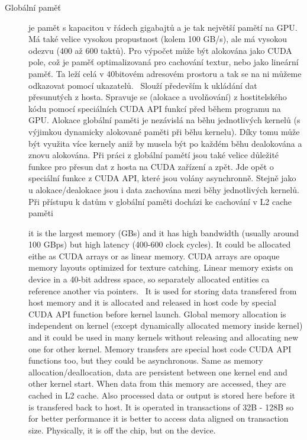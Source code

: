 \begin{description}
\item[Globální paměť] je pamět s kapacitou v řádech gigabajtů a je tak největší pamětí na GPU. Má také velice vysokou propustnost (kolem 100 GB/s), ale má vysokou odezvu (400 až 600 taktů). Pro výpočet může být alokována jako CUDA pole, což je paměť optimalizovaná pro cachování textur, nebo jako lineární paměť. Ta leží celá v 40bitovém adresovém prostoru a tak se na ni můžeme  odkazovat pomocí ukazatelů.~\cite{CUDAGuide} Slouží především k ukládání dat přesunutých z hosta. Spravuje se (alokace a uvolňování) z hostitelského kódu pomocí speciálních CUDA API funkcí před během programu na GPU. Alokace globální paměti je nezávislá na běhu jednotlivých kernelů (s výjimkou dynamicky alokované paměti při běhu kernelu). Díky tomu může být využita více kernely aniž by musela být po každém běhu dealokována a znovu alokována. Při práci z globální pamětí jsou také velice důležité funkce pro přesun dat z hosta na CUDA zařízení a zpět. Jde opět o speciální funkce z CUDA API, které jsou volány asynchronně. Stejně jako u alokace/dealokace jsou i data zachována mezi běhy jednotlivých kernelů. Při přístupu k datům v globální paměti docházi ke cachování v L2 cache paměti 

it is the largest memory (GBs) and it has high bandwidth (usually around 100 GBps) but high latency (400-600 clock cycles). It could be allocated eithe as CUDA arrays or as linear memory. CUDA arrays are opaque memory layouts optimized for texture catching. Linear memory exists on device in a 40-bit address space, so separately allocated entities ca reference another via pointers.~\cite{CUDAGuide} It is used for storing data transfered from host memory and it is allocated and released in host code by special CUDA API function before kernel launch. Global memory allocation is independent on kernel (except dynamically allocated memory inside kernel) and it could be used in many kernels without releasing and allocating new one for other kernel. Memory transfers are special host code CUDA API functions too, but they could be asynchronous. Same as memory allocation/deallocation, data are persistent between one kernel end and other kernel start. When data from this memory are accessed, they are cached in L2 cache. Also processed data or output is stored here before it is transfered back to host. It is operated in transactions of 32B - 128B so for better performance it is better to access data aligned on transaction size. Physically, it is off the chip, but on the device.


\end{description}
